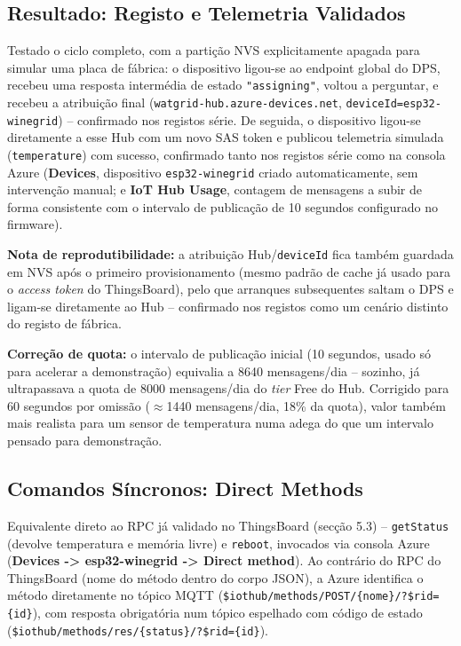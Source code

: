 \documentclass[a4paper,12pt]{article}
\begin{document}
\subsection{Resultado: Registo e Telemetria Validados}
Testado o ciclo completo, com a partição NVS explicitamente apagada para simular uma placa de fábrica: o dispositivo ligou-se ao endpoint global do DPS, recebeu uma resposta intermédia de estado \texttt{"assigning"}, voltou a perguntar, e recebeu a atribuição final (\texttt{watgrid-hub.azure-devices.net}, \texttt{deviceId=esp32-winegrid}) -- confirmado nos registos série. De seguida, o dispositivo ligou-se diretamente a esse Hub com um novo SAS token e publicou telemetria simulada (\texttt{temperature}) com sucesso, confirmado tanto nos registos série como na consola Azure (\textbf{Devices}, dispositivo \texttt{esp32-winegrid} criado automaticamente, sem intervenção manual; e \textbf{IoT Hub Usage}, contagem de mensagens a subir de forma consistente com o intervalo de publicação de 10 segundos configurado no firmware).

\textbf{Nota de reprodutibilidade:} a atribuição Hub/\texttt{deviceId} fica também guardada em NVS após o primeiro provisionamento (mesmo padrão de cache já usado para o \textit{access token} do ThingsBoard), pelo que arranques subsequentes saltam o DPS e ligam-se diretamente ao Hub -- confirmado nos registos como um cenário distinto do registo de fábrica.

\textbf{Correção de quota:} o intervalo de publicação inicial (10 segundos, usado só para acelerar a demonstração) equivalia a 8640 mensagens/dia -- sozinho, já ultrapassava a quota de 8000 mensagens/dia do \textit{tier} Free do Hub. Corrigido para 60 segundos por omissão ($\approx$1440 mensagens/dia, 18\% da quota), valor também mais realista para um sensor de temperatura numa adega do que um intervalo pensado para demonstração.

\subsection{Comandos Síncronos: Direct Methods}
Equivalente direto ao RPC já validado no ThingsBoard (secção 5.3) -- \texttt{getStatus} (devolve temperatura e memória livre) e \texttt{reboot}, invocados via consola Azure (\textbf{Devices -> esp32-winegrid -> Direct method}). Ao contrário do RPC do ThingsBoard (nome do método dentro do corpo JSON), a Azure identifica o método diretamente no tópico MQTT (\texttt{\$iothub/methods/POST/\{nome\}/?\$rid=\{id\}}), com resposta obrigatória num tópico espelhado com código de estado (\texttt{\$iothub/methods/res/\{status\}/?\$rid=\{id\}}).
\end{document}

